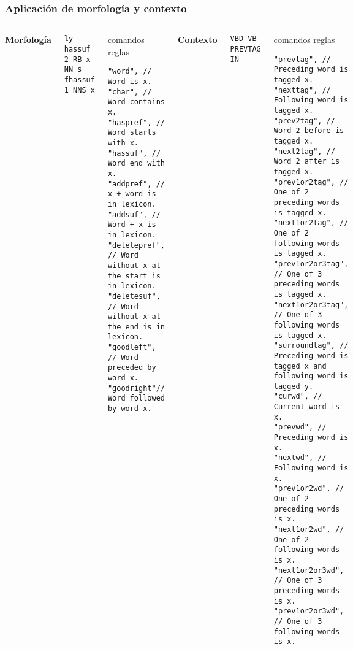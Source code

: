 \documentclass{beamer}
\begin{document}
\begin{frame}[fragile]
\frametitle{Aplicación de morfología y contexto}
\begin{columns}
\textbf{Morfología}
\begin{example}
\begin{tiny}
\begin{verbatim}
ly hassuf 2 RB x
NN s fhassuf 1 NNS x
\end{verbatim}\end{tiny}
\end{example}
\begin{tiny}\begin{block}{comandos reglas}
\begin{verbatim}
"word", // Word is x.
"char", // Word contains x.
"haspref", // Word starts with x.
"hassuf", // Word end with x.
"addpref", // x + word is in lexicon.
"addsuf", // Word + x is in lexicon.
"deletepref", // Word without x at the start is in lexicon.
"deletesuf", // Word without x at the end is in lexicon.
"goodleft", // Word preceded by word x.
"goodright"// Word followed by word x.
\end{verbatim}\end{block}\end{tiny}

\textbf{Contexto}
\begin{example}
\begin{tiny}
\begin{verbatim}
VBD VB PREVTAG IN
\end{verbatim}\end{tiny}
\end{example}
\begin{tiny}\begin{block}{comandos reglas}
\begin{verbatim}
"prevtag", // Preceding word is tagged x.
"nexttag", // Following word is tagged x.
"prev2tag", // Word 2 before is tagged x.
"next2tag", // Word 2 after is tagged x.
"prev1or2tag", // One of 2 preceding words is tagged x.
"next1or2tag", // One of 2 following words is tagged x.
"prev1or2or3tag", // One of 3 preceding words is tagged x.
"next1or2or3tag", // One of 3 following words is tagged x.
"surroundtag", // Preceding word is tagged x and following word is tagged y.
"curwd", // Current word is x.
"prevwd", // Preceding word is x.
"nextwd", // Following word is x.
"prev1or2wd", // One of 2 preceding words is x.
"next1or2wd", // One of 2 following words is x.
"next1or2or3wd", // One of 3 preceding words is x.
"prev1or2or3wd", // One of 3 following words is x.
\end{verbatim}\end{block}\end{tiny}

\end{columns}
\end{frame}
\end{document}
